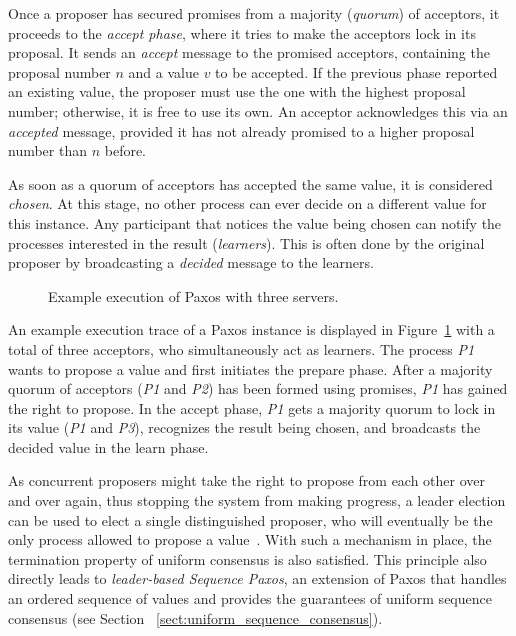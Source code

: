 Once a proposer has secured promises from a majority (\textit{quorum}) of acceptors, it proceeds to the \textit{accept phase}, where it tries to make the acceptors lock in its proposal. It sends an \textit{accept} message to the promised acceptors, containing the proposal number $n$ and a value $v$ to be accepted. If the previous phase reported an existing value, the proposer must use the one with the highest proposal number; otherwise, it is free to use its own. An acceptor acknowledges this via an \textit{accepted} message, provided it has not already promised to a higher proposal number than $n$ before.

As soon as a quorum of acceptors has accepted the same value, it is considered \textit{chosen}. At this stage, no other process can ever decide on a different value for this instance. Any participant that notices the value being chosen can notify the processes interested in the result (\textit{learners}). This is often done by the original proposer by broadcasting a \textit{decided} message to the learners.

\begin{figure}[t]
    \centering
    
    \caption{Example execution of Paxos with three servers.}
    \label{fig:paxos}
\end{figure}

An example execution trace of a Paxos instance is displayed in Figure~\ref{fig:paxos} with a total of three acceptors, who simultaneously act as learners. The process \textit{P1} wants to propose a value and first initiates the prepare phase. After a majority quorum of acceptors (\textit{P1} and \textit{P2}) has been formed using promises, \textit{P1} has gained the right to propose. In the accept phase, \textit{P1} gets a majority quorum to lock in its value (\textit{P1} and \textit{P3}), recognizes the result being chosen, and broadcasts the decided value in the learn phase.

As concurrent proposers might take the right to propose from each other over and over again, thus stopping the system from making progress, a leader election can be used to elect a single distinguished proposer, who will eventually be the only process allowed to propose a value~\cite{Lamport-Paxos-2001}. With such a mechanism in place, the termination property of uniform consensus is also satisfied. This principle also directly leads to \textit{leader-based Sequence Paxos}, an extension of Paxos that handles an ordered sequence of values and provides the guarantees of uniform sequence consensus (see Section ~\ref{sect:uniform_sequence_consensus}).

